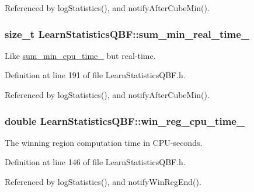Referenced by log\-Statistics(), and notify\-After\-Cube\-Min().

\hypertarget{classLearnStatisticsQBF_a6aded3992cd822a0ca45bc2d6658a5ab}{
\subsubsection[{sum\-\_\-min\-\_\-real\-\_\-time\-\_\-}]{\setlength{\rightskip}{0pt plus 5cm}size\-\_\-t Learn\-Statistics\-Q\-B\-F\-::sum\-\_\-min\-\_\-real\-\_\-time\-\_\-\hspace{0.3cm}{\ttfamily [protected]}}}\label{classLearnStatisticsQBF_a6aded3992cd822a0ca45bc2d6658a5ab}


Like \hyperlink{classLearnStatisticsQBF_a8fcce1bc5593631429c86bd3a1376e86}{sum\-\_\-min\-\_\-cpu\-\_\-time\-\_\-} but real-\/time. 



Definition at line 191 of file Learn\-Statistics\-Q\-B\-F.\-h.



Referenced by log\-Statistics(), and notify\-After\-Cube\-Min().

\hypertarget{classLearnStatisticsQBF_a679a221c1cbf3330572f93d850976289}{
\subsubsection[{win\-\_\-reg\-\_\-cpu\-\_\-time\-\_\-}]{\setlength{\rightskip}{0pt plus 5cm}double Learn\-Statistics\-Q\-B\-F\-::win\-\_\-reg\-\_\-cpu\-\_\-time\-\_\-\hspace{0.3cm}{\ttfamily [protected]}}}\label{classLearnStatisticsQBF_a679a221c1cbf3330572f93d850976289}


The winning region computation time in C\-P\-U-\/seconds. 



Definition at line 146 of file Learn\-Statistics\-Q\-B\-F.\-h.



Referenced by log\-Statistics(), and notify\-Win\-Reg\-End().

